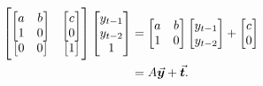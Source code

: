 \documentclass[MathsNotesBase.tex]{subfiles}
\begin{document}
{		\begin{align*}
		&&	\begin{bmatrix}
				\begin{bmatrix}a & b\\1 & 0\end{bmatrix} & \begin{bmatrix}c\\0\end{bmatrix} \\
				\begin{bmatrix}0 & 0\end{bmatrix} & \begin{bmatrix}1\end{bmatrix}	
			\end{bmatrix}
			\begin{bmatrix}y_{t-1}\\y_{t-2}\\1\end{bmatrix} &= 
			\begin{bmatrix}a & b\\1 & 0\end{bmatrix}\begin{bmatrix}y_{t-1}\\y_{t-2}\end{bmatrix} +
			\begin{bmatrix}c\\0\end{bmatrix} \\
		&&  &= A\vec{\bm{y}} + \vec{\bm{t}}. \\
		\end{align*}
		
}
\end{document}
